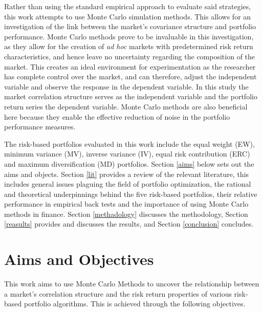 \documentclass[11pt,preprint, authoryear]{elsarticle}
\numberwithin{equation}{section}
\numberwithin{figure}{section}
\numberwithin{table}{section}
\begin{document}
Rather than using the standard empirical approach to evaluate said
strategies, this work attempts to use Monte Carlo simulation methods.
This allows for an investigation of the link between the market's
covariance structure and portfolio performance. Monte Carlo methods
prove to be invaluable in this investigation, as they allow for the
creation of \emph{ad hoc} markets with predetermined risk return
characteristics, and hence leave no uncertainty regarding the
composition of the market. This creates an ideal environment for
experimentation as the researcher has complete control over the market,
and can therefore, adjust the independent variable and observe the
response in the dependent variable. In this study the market correlation
structure serves as the independent variable and the portfolio return
series the dependent variable. Monte Carlo methods are also beneficial
here because they enable the effective reduction of noise in the
portfolio performance measures.

The risk-based portfolios evaluated in this work include the equal
weight (EW), minimum variance (MV), inverse variance (IV), equal risk
contribution (ERC) and maximum diversification (MD) portfolios. Section
\ref{aims} below sets out the aims and objects. Section \ref{lit}
provides a review of the relevant literature, this includes general
issues plaguing the field of portfolio optimization, the rational and
theoretical underpinnings behind the five risk-based portfolios, their
relative performance in empirical back tests and the importance of using
Monte Carlo methods in finance. Section \ref{methadology} discusses the
methodology, Section \ref{reasults} provides and discusses the results,
and Section \ref{conclusion} concludes.

\newpage

\hypertarget{aims-and-objectives}{%
\section{\texorpdfstring{Aims and Objectives
\label{aims}}{Aims and Objectives }}\label{aims-and-objectives}}

This work aims to use Monte Carlo Methods to uncover the relationship
between a market's correlation structure and the risk return properties
of various risk-based portfolio algorithms. This is achieved through the
following objectives.
\end{document}
